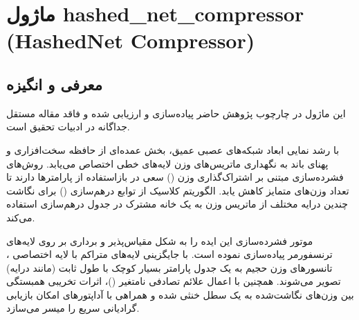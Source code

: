 \section{ماژول hashed\_net\_compressor (HashedNet Compressor)}
\label{sec:module_hashed_net_compressor}

\subsection{معرفی و انگیزه}
این ماژول در چارچوب پژوهش حاضر پیاده‌سازی و ارزیابی شده و فاقد مقاله مستقل جداگانه در ادبیات تحقیق است.

با رشد نمایی ابعاد شبکه‌های عصبی عمیق، بخش عمده‌ای از حافظه سخت‌افزاری و پهنای باند به نگهداری ماتریس‌های وزن لایه‌های خطی اختصاص می‌یابد. روش‌های فشرده‌سازی مبتنی بر اشتراک‌گذاری وزن () سعی در بازاستفاده از پارامترها دارند تا تعداد وزن‌های متمایز کاهش یابد. الگوریتم کلاسیک  از توابع درهم‌سازی () برای نگاشت چندین درایه مختلف از ماتریس وزن به یک خانه مشترک در جدول درهم‌سازی استفاده می‌کند.

موتور فشرده‌سازی  این ایده را به شکل مقیاس‌پذیر و برداری بر روی لایه‌های ترنسفورمر پیاده‌سازی نموده است. با جایگزینی لایه‌های متراکم با لایه اختصاصی ، تانسورهای وزن حجیم به یک جدول پارامتر بسیار کوچک با طول ثابت (مانند  درایه) تصویر می‌شوند. همچنین با اعمال علائم تصادفی نامتغیر ()، اثرات تخریبی همبستگی بین وزن‌های نگاشت‌شده به یک سطل خنثی شده و همراهی با آداپتورهای  امکان بازیابی گرادیانی سریع را میسر می‌سازد.

